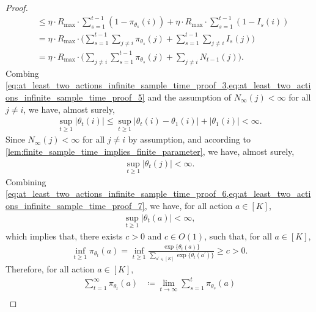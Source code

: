 \begin{proof}
\begin{align}
    &\le \eta \cdot R_{\max} \cdot \sum_{s=1}^{t-1}{ \left( 1 - \pi_{\theta_s}(i) \right) } + \eta \cdot R_{\max} \cdot \sum_{s=1}^{t-1}{ \left( 1 - I_s(i) \right) } \\
    &= \eta \cdot R_{\max} \cdot \Big( \sum_{s=1}^{t-1} \sum_{j \ne i}{ \pi_{\theta_s}(j) } +  \sum_{s=1}^{t-1} \sum_{j \ne i}{ I_s(j) } \Big) \\
    &= \eta \cdot R_{\max} \cdot \Big( \sum_{j \ne i} \sum_{s=1}^{t-1}{\pi_{\theta_s}(j)} + \sum_{j \ne i}{ N_{t-1}(j) } \Big).
\end{align}
Combing \cref{eq:at_least_two_actions_infinite_sample_time_proof_3,eq:at_least_two_actions_infinite_sample_time_proof_5} and the assumption of $N_\infty(j) < \infty$ for all $j \ne i$, we have, almost surely,
\begin{align}
\label{eq:at_least_two_actions_infinite_sample_time_proof_6}
    \sup_{t \ge 1}{ \left| \theta_t(i) \right| } \le \sup_{t \ge 1}{ \left| \theta_t(i) - \theta_1(i) \right| + \left| \theta_1(i) \right| } < \infty.
\end{align}
Since $N_\infty(j) < \infty$ for all $j \ne i$ by assumption, and according to \cref{lem:finite_sample_time_implies_finite_parameter}, we have, almost surely,
\begin{align}
\label{eq:at_least_two_actions_infinite_sample_time_proof_7}
    \sup_{t \ge 1}{ \left| \theta_t(j) \right| } < \infty.
\end{align}
Combining \cref{eq:at_least_two_actions_infinite_sample_time_proof_6,eq:at_least_two_actions_infinite_sample_time_proof_7}, we have,  for all action $a \in [K]$,
\begin{align}
\label{eq:at_least_two_actions_infinite_sample_time_proof_8}
    \sup_{t \ge 1}{ \left| \theta_t(a) \right| } < \infty,
\end{align}
which implies that, there exists $c > 0$ and $c \in O(1)$, such that, for all $a \in [K]$,
\begin{align}
\label{eq:at_least_two_actions_infinite_sample_time_proof_9}
    \inf_{t \ge 1}{ \pi_{\theta_t}(a) } = \inf_{t \ge 1}{ \frac{ \exp\{ \theta_t(a) \} }{ \sum_{a^\prime \in [K]}{ \exp\{ \theta_t(a^\prime) } \} } } \ge c > 0.
\end{align}
Therefore, for all action $a \in [K]$,
\begin{align}
\label{eq:at_least_two_actions_infinite_sample_time_proof_10}
    \sum_{t=1}^{\infty}{\pi_{\theta_t}(a)} &\coloneqq \lim_{t \to \infty}{ \sum_{s=1}^{t}{ \pi_{\theta_s}(a) } } \\

\end{align}
\end{proof}
